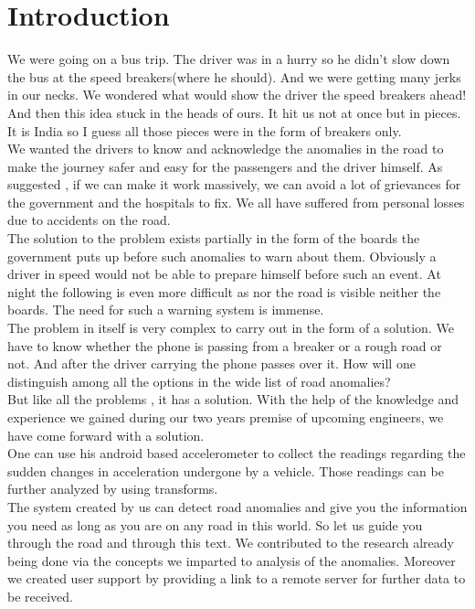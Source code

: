 \documentclass[12pt,twocolumn]{article}
\begin{document}
\section{Introduction}
We were going on a bus trip. The driver was in a hurry so he didn't slow down the bus at the speed breakers(where he should). And we were getting many jerks in our necks. We wondered what would show the driver the speed breakers ahead! And then this idea stuck in the heads of ours. It hit us not at once but in pieces. It is India so I guess all those pieces were in the form of breakers only.\\
We wanted the drivers to know and acknowledge the anomalies in the road to make the journey safer and easy for the passengers and the driver himself.
As suggested , if we can make it work massively, we can avoid a lot of grievances for the government and the hospitals to fix. We all have suffered from personal losses due to accidents on the road.\\
The solution to the problem exists partially in the form of the boards the government puts up before such anomalies to warn about them. Obviously a driver in speed would not be able to prepare himself before such an event. At night the following is even more difficult as nor the road is visible neither the boards. The need for such a warning system is immense.\\
The problem in itself is very complex to carry out in the form of a solution. We have to know whether the phone is passing from a breaker or a rough road or not. And after the driver carrying the phone passes over it. How will one distinguish among all the options in the wide list of road anomalies?\\
But like all the problems , it has a solution. With the help of the knowledge and experience we gained during our two years premise of upcoming engineers, we have come forward with a solution.\\
One can use his android based accelerometer to collect the readings regarding the sudden changes in acceleration undergone by a vehicle. Those readings can be further analyzed by using transforms.\\
The system created by us can detect road anomalies and give you the information you need as long as you are on any road in this world.
So let us guide you through the road and through this text. We contributed to the research already being done via the concepts we imparted to analysis of the anomalies. Moreover we created user support by providing a link to a remote server for further data to be received.\\
\end{document}
